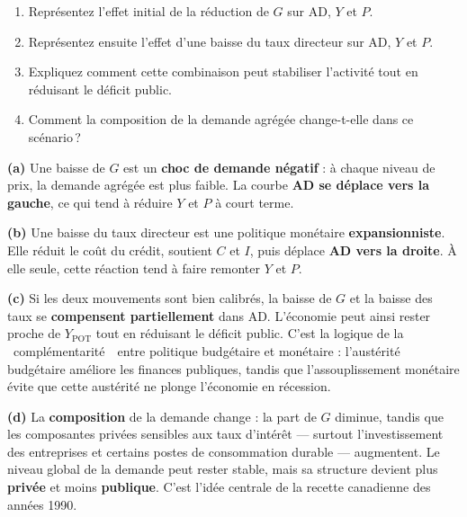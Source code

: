 
\begin{enumerate}[label=(\alph*)]
   \item Représentez l'effet initial de la réduction de $G$ sur AD, $Y$ et $P$.
   \item Représentez ensuite l'effet d'une baisse du taux directeur sur AD, $Y$ et $P$.
   \item Expliquez comment cette combinaison peut stabiliser l'activité tout en réduisant le déficit public.
   \item Comment la composition de la demande agrégée change-t-elle dans ce scénario\,?
\end{enumerate}

\begin{reponse}
\textbf{(a)} Une baisse de $G$ est un \textbf{choc de demande négatif} : à chaque niveau de prix, la demande agrégée est plus faible. La courbe \textbf{AD se déplace vers la gauche}, ce qui tend à réduire $Y$ et $P$ à court terme.

\textbf{(b)} Une baisse du taux directeur est une politique monétaire \textbf{expansionniste}. Elle réduit le coût du crédit, soutient $C$ et $I$, puis déplace \textbf{AD vers la droite}. À elle seule, cette réaction tend à faire remonter $Y$ et $P$.

\textbf{(c)} Si les deux mouvements sont bien calibrés, la baisse de $G$ et la baisse des taux se \textbf{compensent partiellement} dans AD. L'économie peut ainsi rester proche de $Y_{\text{POT}}$ tout en réduisant le déficit public. C'est la logique de la \guillemotleft~complémentarité~\guillemotright\ entre politique budgétaire et monétaire : l'austérité budgétaire améliore les finances publiques, tandis que l'assouplissement monétaire évite que cette austérité ne plonge l'économie en récession.

\textbf{(d)} La \textbf{composition} de la demande change : la part de $G$ diminue, tandis que les composantes privées sensibles aux taux d'intérêt --- surtout l'investissement des entreprises et certains postes de consommation durable --- augmentent. Le niveau global de la demande peut rester stable, mais sa structure devient plus \textbf{privée} et moins \textbf{publique}. C'est l'idée centrale de la recette canadienne des années 1990.
\end{reponse}


